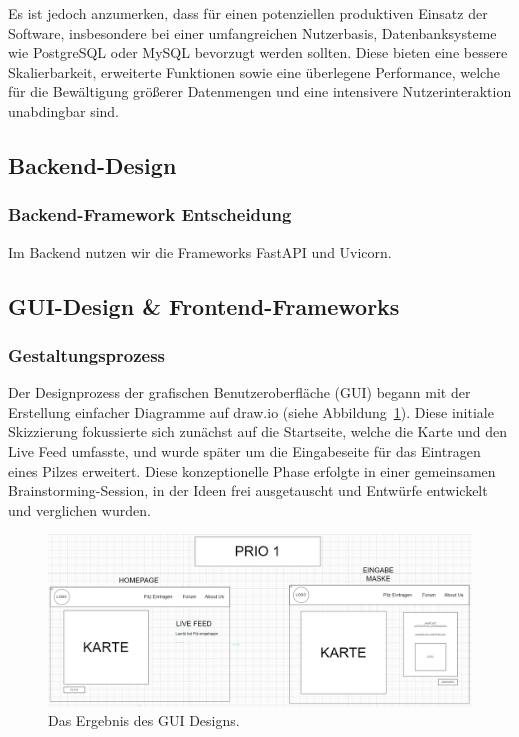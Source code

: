 \documentclass[../main.tex]{subfiles} %
\begin{document}
Es ist jedoch anzumerken, dass für einen potenziellen produktiven Einsatz der Software, insbesondere bei einer umfangreichen Nutzerbasis, Datenbanksysteme wie PostgreSQL oder MySQL bevorzugt werden sollten.
Diese bieten eine bessere Skalierbarkeit, erweiterte Funktionen sowie eine überlegene Performance, welche für die Bewältigung größerer Datenmengen und eine intensivere Nutzerinteraktion unabdingbar sind.

\subsection{Backend-Design} %


\subsubsection{Backend-Framework Entscheidung}

Im Backend nutzen wir die Frameworks FastAPI und Uvicorn.

\subsection{GUI-Design \& Frontend-Frameworks} %

\subsubsection{Gestaltungsprozess}

Der Designprozess der grafischen Benutzeroberfläche (GUI) begann mit der Erstellung einfacher Diagramme auf draw.io
(siehe Abbildung~\ref{fig:GUI_Entwurf}). Diese initiale Skizzierung fokussierte sich zunächst auf die Startseite, welche
die Karte und den Live Feed umfasste, und wurde später um die Eingabeseite für das Eintragen eines Pilzes erweitert. Diese
konzeptionelle Phase erfolgte in einer gemeinsamen Brainstorming-Session, in der Ideen frei ausgetauscht und Entwürfe
entwickelt und verglichen wurden.

\begin{figure}[ht]
	\centering
	\includegraphics[width=\textwidth]{abbildungen/GuiEntwurfDrawio.jpg}
	\caption{Das Ergebnis des GUI Designs.}
	\label{fig:GUI_Entwurf}
\end{figure}
\end{document}
